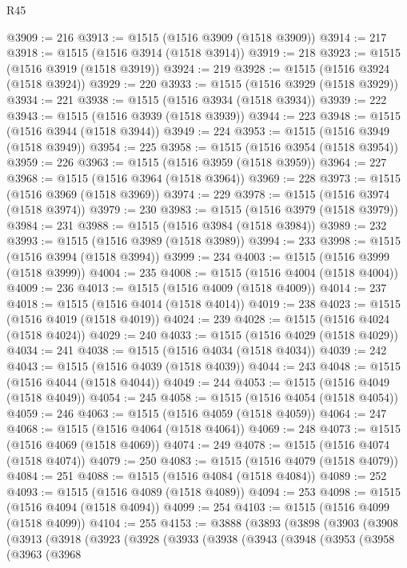 \begin{lexlean}{R45}
\begin{coremodule}
{@3909 := 216
@3913 := @1515 (@1516 @3909 (@1518 @3909))
@3914 := 217
@3918 := @1515 (@1516 @3914 (@1518 @3914))
@3919 := 218
@3923 := @1515 (@1516 @3919 (@1518 @3919))
@3924 := 219
@3928 := @1515 (@1516 @3924 (@1518 @3924))
@3929 := 220
@3933 := @1515 (@1516 @3929 (@1518 @3929))
@3934 := 221
@3938 := @1515 (@1516 @3934 (@1518 @3934))
@3939 := 222
@3943 := @1515 (@1516 @3939 (@1518 @3939))
@3944 := 223
@3948 := @1515 (@1516 @3944 (@1518 @3944))
@3949 := 224
@3953 := @1515 (@1516 @3949 (@1518 @3949))
@3954 := 225
@3958 := @1515 (@1516 @3954 (@1518 @3954))
@3959 := 226
@3963 := @1515 (@1516 @3959 (@1518 @3959))
@3964 := 227
@3968 := @1515 (@1516 @3964 (@1518 @3964))
@3969 := 228
@3973 := @1515 (@1516 @3969 (@1518 @3969))
@3974 := 229
@3978 := @1515 (@1516 @3974 (@1518 @3974))
@3979 := 230
@3983 := @1515 (@1516 @3979 (@1518 @3979))
@3984 := 231
@3988 := @1515 (@1516 @3984 (@1518 @3984))
@3989 := 232
@3993 := @1515 (@1516 @3989 (@1518 @3989))
@3994 := 233
@3998 := @1515 (@1516 @3994 (@1518 @3994))
@3999 := 234
@4003 := @1515 (@1516 @3999 (@1518 @3999))
@4004 := 235
@4008 := @1515 (@1516 @4004 (@1518 @4004))
@4009 := 236
@4013 := @1515 (@1516 @4009 (@1518 @4009))
@4014 := 237
@4018 := @1515 (@1516 @4014 (@1518 @4014))
@4019 := 238
@4023 := @1515 (@1516 @4019 (@1518 @4019))
@4024 := 239
@4028 := @1515 (@1516 @4024 (@1518 @4024))
@4029 := 240
@4033 := @1515 (@1516 @4029 (@1518 @4029))
@4034 := 241
@4038 := @1515 (@1516 @4034 (@1518 @4034))
@4039 := 242
@4043 := @1515 (@1516 @4039 (@1518 @4039))
@4044 := 243
@4048 := @1515 (@1516 @4044 (@1518 @4044))
@4049 := 244
@4053 := @1515 (@1516 @4049 (@1518 @4049))
@4054 := 245
@4058 := @1515 (@1516 @4054 (@1518 @4054))
@4059 := 246
@4063 := @1515 (@1516 @4059 (@1518 @4059))
@4064 := 247
@4068 := @1515 (@1516 @4064 (@1518 @4064))
@4069 := 248
@4073 := @1515 (@1516 @4069 (@1518 @4069))
@4074 := 249
@4078 := @1515 (@1516 @4074 (@1518 @4074))
@4079 := 250
@4083 := @1515 (@1516 @4079 (@1518 @4079))
@4084 := 251
@4088 := @1515 (@1516 @4084 (@1518 @4084))
@4089 := 252
@4093 := @1515 (@1516 @4089 (@1518 @4089))
@4094 := 253
@4098 := @1515 (@1516 @4094 (@1518 @4094))
@4099 := 254
@4103 := @1515 (@1516 @4099 (@1518 @4099))
@4104 := 255
@4153 := @3888
    (@3893
      (@3898
        (@3903
          (@3908
            (@3913
              (@3918
                (@3923
                  (@3928
                    (@3933
                      (@3938
                        (@3943
                          (@3948
                            (@3953
                              (@3958
                                (@3963
                                  (@3968
}
\end{coremodule}
\end{lexlean}
